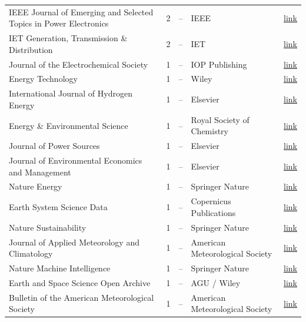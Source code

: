 \begin{table}[htbp]
\begin{tabular}{lrcll}
    IEEE Journal of Emerging and Selected Topics in Power Electronics & 2 & -- & IEEE & \href{https://ieeexplore.ieee.org/xpl/RecentIssue.jsp?punumber=6245517}{link} \\
    IET Generation, Transmission \& Distribution & 2 & -- & IET & \href{https://ietresearch.onlinelibrary.wiley.com/journal/17518695}{link} \\
    Journal of the Electrochemical Society & 1 & -- & IOP Publishing & \href{https://iopscience.iop.org/journal/1945-7111}{link} \\
    Energy Technology & 1 & -- & Wiley & \href{https://onlinelibrary.wiley.com/journal/21944296}{link} \\
    International Journal of Hydrogen Energy & 1 & -- & Elsevier & \href{https://www.sciencedirect.com/journal/international-journal-of-hydrogen-energy}{link} \\
    Energy \& Environmental Science & 1 & -- & Royal Society of Chemistry & \href{https://pubs.rsc.org/en/journals/journalissues/ee}{link} \\
    Journal of Power Sources & 1 & -- & Elsevier & \href{https://www.sciencedirect.com/journal/journal-of-power-sources}{link} \\
    Journal of Environmental Economics and Management & 1 & -- & Elsevier & \href{https://www.sciencedirect.com/journal/journal-of-environmental-economics-and-management}{link} \\
    Nature Energy & 1 & -- & Springer Nature & \href{https://www.nature.com/nenergy/}{link} \\
    Earth System Science Data & 1 & -- & Copernicus Publications & \href{https://www.earth-system-science-data.net/}{link} \\
    Nature Sustainability & 1 & -- & Springer Nature & \href{https://www.nature.com/natsustain/}{link} \\
    Journal of Applied Meteorology and Climatology & 1 & -- & American Meteorological Society & \href{https://journals.ametsoc.org/view/journals/apme/apme-overview.xml}{link} \\
    Nature Machine Intelligence & 1 & -- & Springer Nature & \href{https://www.nature.com/natmachintell/}{link} \\
    Earth and Space Science Open Archive & 1 & -- & AGU / Wiley & \href{https://essopenarchive.org/}{link} \\
    Bulletin of the American Meteorological Society & 1 & -- & American Meteorological Society & \href{https://journals.ametsoc.org/view/journals/bams/bams-overview.xml}{link} \\

\end{tabular}
\end{table}
